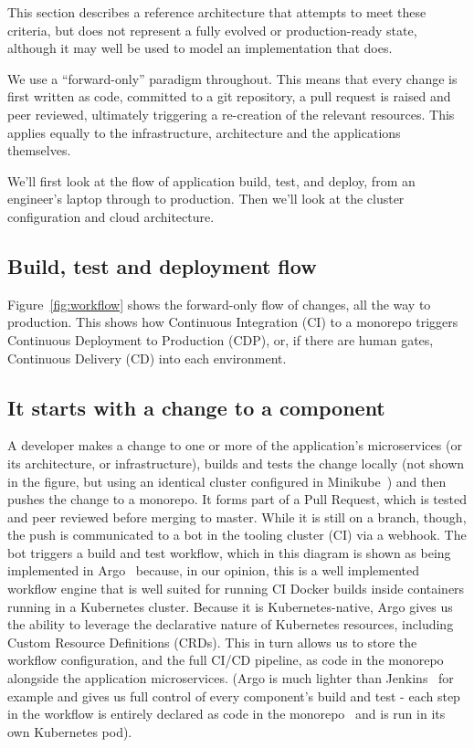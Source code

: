 \documentclass[reprint,amsmath,amssymb,aps]{revtex4-1}
\begin{document}
This section describes a reference architecture that attempts to meet these criteria, but does not represent a fully evolved or production-ready state, although it may well be used to model an implementation that does.

We use a “forward-only” paradigm throughout. This means that every change is first written as code, committed to a git repository, a pull request is raised and peer reviewed, ultimately triggering a re-creation of the relevant resources. This applies equally to the infrastructure, architecture and the applications themselves.

We’ll first look at the flow of application build, test, and deploy, from an engineer’s laptop through to production. Then we’ll look at the cluster configuration and cloud architecture.

\subsection{\label{sec:buildflow}Build, test and deployment flow}

Figure~\ref{fig:workflow} shows the forward-only flow of changes, all the way to production. This shows how Continuous Integration (CI) to a monorepo triggers Continuous Deployment to Production (CDP), or, if there are human gates, Continuous Delivery (CD) into each environment.

\subsection{\label{sec:initialchange}It starts with a change to a component}

A developer makes a change to one or more of the application’s microservices (or its architecture, or infrastructure), builds and tests the change locally (not shown in the figure, but using an identical cluster configured in Minikube~\cite{RunningK70:online}) and then pushes the change to a monorepo. It forms part of a Pull Request, which is tested and peer reviewed before merging to master. While it is still on a branch, though, the push is communicated to a bot in the tooling cluster (CI) via a webhook. The bot triggers a build and test workflow, which in this diagram is shown as being implemented in Argo~\cite{argoproj96:online} because, in our opinion, this is a well implemented workflow engine that is well suited for running CI Docker builds inside containers running in a Kubernetes cluster. Because it is Kubernetes-native, Argo gives us the ability to leverage the declarative nature of Kubernetes resources, including Custom Resource Definitions (CRDs). This in turn allows us to store the workflow configuration, and the full CI/CD pipeline, as code in the monorepo alongside the application microservices. (Argo is much lighter than Jenkins~\cite{Jenkins9:online} for example and gives us full control of every component’s build and test - each step in the workflow is entirely declared as code in the monorepo~\cite{Monorepo54:online} and is run in its own Kubernetes pod).
\end{document}
